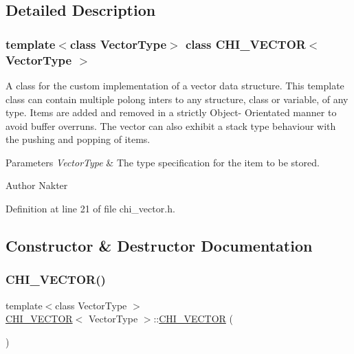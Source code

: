 \subsection{Detailed Description}
\subsubsection*{template$<$class Vector\+Type$>$\newline
class C\+H\+I\+\_\+\+V\+E\+C\+T\+O\+R$<$ Vector\+Type $>$}

A class for the custom implementation of a vector data structure. This template class can contain multiple polong inters to any structure, class or variable, of any type. Items are added and removed in a strictly Object-\/ Orientated manner to avoid buffer overruns. The vector can also exhibit a stack type behaviour with the pushing and popping of items.


\begin{DoxyParams}{Parameters}
{\em Vector\+Type} & The type specification for the item to be stored.\\
\hline
\end{DoxyParams}
\begin{DoxyAuthor}{Author}
Nakter 
\end{DoxyAuthor}


Definition at line 21 of file chi\+\_\+vector.\+h.



\subsection{Constructor \& Destructor Documentation}
\mbox{\label{class_c_h_i___v_e_c_t_o_r_a2789baba8522fffd305476bab1b5e359_a2789baba8522fffd305476bab1b5e359}} 
\subsubsection{\texorpdfstring{C\+H\+I\+\_\+\+V\+E\+C\+T\+O\+R()}{CHI\_VECTOR()}}
{\footnotesize\ttfamily template$<$class Vector\+Type $>$ \\
\hyperlink{class_c_h_i___v_e_c_t_o_r}{C\+H\+I\+\_\+\+V\+E\+C\+T\+OR}$<$ Vector\+Type $>$\+::\hyperlink{class_c_h_i___v_e_c_t_o_r}{C\+H\+I\+\_\+\+V\+E\+C\+T\+OR} (\begin{DoxyParamCaption}{ }\end{DoxyParamCaption})}

